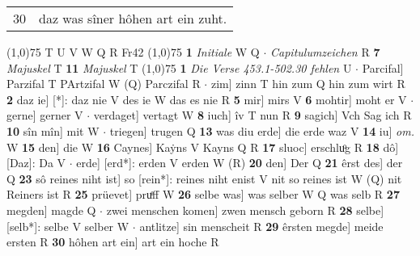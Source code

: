 \documentclass[8pt,a4paper,notitlepage]{article}
\begin{document}
\begin{table}[ht]
\begin{minipage}[t]{0.5\linewidth}
\begin{tabular}{rl}
30 & daz was sîner hôhen art ein zuht.\\ 
\end{tabular}
\scriptsize
\line(1,0){75} \newline
T U V W Q R Fr42 \newline
\line(1,0){75} \newline
\textbf{1} \textit{Initiale} W Q   $\cdot$ \textit{Capitulumzeichen} R  \textbf{7} \textit{Majuskel} T  \textbf{11} \textit{Majuskel} T  \newline
\line(1,0){75} \newline
\textbf{1} \textit{Die Verse 453.1-502.30 fehlen} U   $\cdot$ Parcifal] Parzifal T PArtzifal W (Q) Parczifal R  $\cdot$ zim] zinn T hin zum Q hin zum wirt R \textbf{2} daz ie] [*]: daz nie V des ie W das es nie R \textbf{5} mir] mirs V \textbf{6} mohtir] moht er V  $\cdot$ gerne] gerner V  $\cdot$ verdaget] vertagt W \textbf{8} iuch] îv T nun R \textbf{9} sagich] Vch Sag ich R \textbf{10} sîn mîn] mit W  $\cdot$ triegen] trugen Q \textbf{13} was diu erde] die erde waz V \textbf{14} iu] \textit{om.} W \textbf{15} den] die W \textbf{16} Caynes] Kaẏns V Kayns Q R \textbf{17} sluoc] erschluͦg R \textbf{18} dô] [Daz]: Da V  $\cdot$ erde] [erd*]: erden V erden W (R) \textbf{20} den] Der Q \textbf{21} êrst des] der Q \textbf{23} sô reines niht ist] so [rein*]: reines niht enist V nit so reines ist W (Q) nit Reiners ist R \textbf{25} prüevet] pruͤff W \textbf{26} selbe was] was selber W Q was selb R \textbf{27} megden] magde Q  $\cdot$ zwei menschen komen] zwen mensch geborn R \textbf{28} selbe] [selb*]: selbe V selber W  $\cdot$ antlitze] sin menscheit R \textbf{29} êrsten megde] meide ersten R \textbf{30} hôhen art ein] art ein hoche R \newline
\end{minipage}
\end{table}
\end{document}
